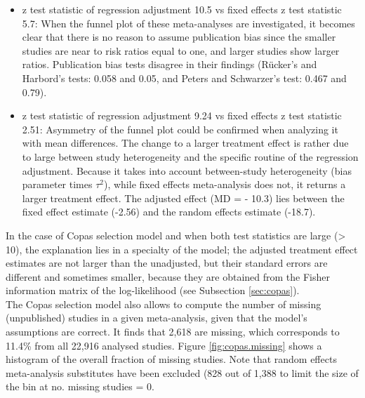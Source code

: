 \documentclass[11pt,a4paper,twoside]{book}\usepackage[]{graphicx}\usepackage[]{color}
\begin{document}
\begin{itemize}
\item z test statistic of regression adjustment 10.5 vs fixed effects z test statistic 5.7: When the funnel plot of these meta-analyses are investigated, it becomes clear that there is no reason to assume publication bias since the smaller studies are near to risk ratios equal to one, and larger studies show larger ratios. Publication bias tests disagree in their findings (R\"ucker's and Harbord's tests: 0.058 and 0.05, and Peters and Schwarzer's test: 0.467 and 0.79).
\item z test statistic of regression adjustment 9.24 vs fixed effects z test statistic 2.51: Asymmetry of the funnel plot could be confirmed when analyzing it with mean differences. The change to a larger treatment effect is rather due to large between study heterogeneity and the specific routine of the regression adjustment. Because it takes into account between-study heterogeneity (bias parameter times $\tau^2$), while fixed effects meta-analysis does not, it returns a larger treatment effect. The adjusted effect (MD = - 10.3) lies between the fixed effect estimate (-2.56) and the random effects estimate (-18.7).
\end{itemize}
In the case of Copas selection model and when both test statistics are large (> 10), the explanation lies in a specialty of the model; the adjusted treatment effect estimates are not larger than the unadjusted, but their standard errors are different and sometimes smaller, because they are obtained from the Fisher information matrix of the log-likelihood (see Subsection \ref{sec:copas}). \\
The Copas selection model also allows to compute the number of missing (\ie unpublished) studies in a given meta-analysis, given that the model's assumptions are correct. It finds that 2,618 are missing, which corresponds to 11.4\% from all 22,916 analysed studies. Figure \ref{fig:copas.missing} shows a histogram of the overall fraction of missing studies. Note that random effects meta-analysis substitutes have been excluded (828 out of 1,388 to limit the size of the bin at no. missing studies = 0.
\end{document}
